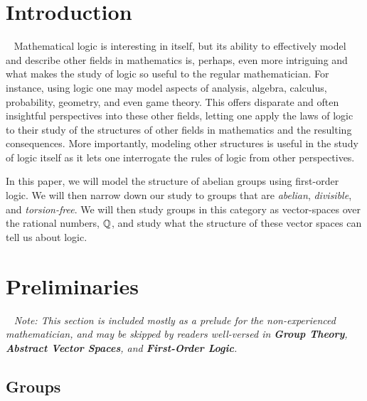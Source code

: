 \section{Introduction}~\label{sec:prelims}
Mathematical logic is interesting in itself, but
its ability to effectively model and describe other
fields in mathematics is, perhaps, even more intriguing
and what makes the study of logic so useful to the regular
mathematician.
For instance, using logic one may model aspects of
analysis, algebra, calculus, probability, geometry,
and even game theory.
This offers disparate and often insightful perspectives into these other fields,
letting one apply the laws of logic to their study of the structures
of other fields in mathematics and the resulting consequences.
More importantly, modeling other structures is useful in the study of logic
itself as it lets one interrogate the rules of logic from other perspectives.

In this paper, we will model the structure of abelian groups using
first-order logic. We will then narrow down our study to groups that
are \emph{abelian}, \emph{divisible}, and \emph{torsion-free}.
We will then study groups in this category as vector-spaces
over the rational numbers, $\mathbb{Q}$, and study what the structure of these
vector spaces can tell us about logic.











\newpage
\section{Preliminaries}~\label{sec:preliminaries}
\emph{
  Note: This section is included mostly as a prelude for the
  non-experienced mathematician, and may be skipped by readers
  well-versed in
  \textbf{Group Theory},
  \textbf{Abstract Vector Spaces},
  and \textbf{First-Order Logic}.
}

\subsection{Groups}~\label{sec:def-groups}

